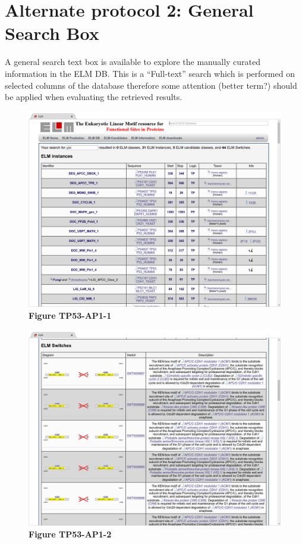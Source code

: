 \section{Alternate protocol 2: General Search
Box}\label{alternate-protocol-2-general-search-box}

A general search text box is available to explore the manually curated
information in the ELM DB. This is a ``Full-text'' search which is
performed on selected columns of the database therefore some attention
(better term?) should be applied when evaluating the retrieved results.

\begin{figure}[h!]
\centering
\includegraphics[width=\textwidth]{Figures/TP53_3/TP53_instances.png} 
\caption{\textbf{Figure TP53-AP1-1}}
\end{figure}

\begin{figure}[h!]
\centering
\includegraphics[width=\textwidth]{Figures/TP53_3/TP53_switches.png} 
\caption{
\textbf{Figure TP53-AP1-2}
}
\end{figure}

